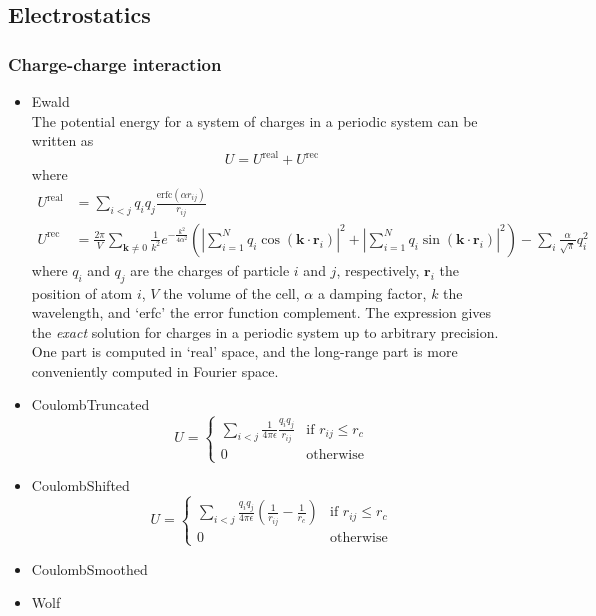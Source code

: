 \subsection{Electrostatics}

\subsubsection{Charge-charge interaction}
\begin{itemize}
\item{Ewald}\\
The potential energy for a system of charges in a periodic system can be written as
\begin{equation}
 U=U^{\text{real}}+U^{\text{rec}}
\end{equation}
where
\begin{equation}
 \begin{split}
 U^{\text{real}}
  &=\sum_{i<j} q_i q_j \frac{\text{erfc}\left(\alpha r_{ij}\right)}{r_{ij}}\\
 U^{\text{rec}}
  &=\frac{2\pi}{V}\sum_{\mathbf{k}\not=0}\frac{1}{k^2} e^{-\frac{k^2}{4\alpha^2}}
  \left(\left|\sum_{i=1}^N q_i\cos\left(\mathbf{k}\cdot\mathbf{r}_i\right)\right|^2+
   \left|\sum_{i=1}^N q_i\sin\left(\mathbf{k}\cdot\mathbf{r}_i\right)\right|^2\right)
 -\sum_i\frac{\alpha}{\sqrt{\pi}}q_i^2
 \end{split}
\end{equation}
where $q_i$ and $q_j$ are the charges of particle $i$ and $j$, respectively, $\mathbf{r}_i$ the position of atom $i$, $V$ the volume of the cell,
$\alpha$ a damping factor, $k$ the wavelength, and `erfc' the error function complement. The expression gives the \emph{exact} solution for charges
in a periodic system up to arbitrary precision. One part is computed in `real' space, and the long-range part is more conveniently computed in Fourier space.

\item{CoulombTruncated}
\begin{equation}
 U=\begin{cases}
    \sum_{i<j} \frac{1}{4\pi\epsilon}\frac{q_i q_j}{r_{ij}}& \text{if }r_{ij}\leq r_c\\
    0 & \text{otherwise}
   \end{cases}
\end{equation}

\item{CoulombShifted}
\begin{equation}
 U=\begin{cases}
    \sum_{i<j} \frac{q_i q_j}{4\pi \epsilon }\left(\frac{1}{r_{ij}}-\frac{1}{r_c}\right)& \text{if }r_{ij}\leq r_c\\
    0 & \text{otherwise}
   \end{cases}
\end{equation}

\item{CoulombSmoothed}
\item{Wolf}

\end{itemize}

